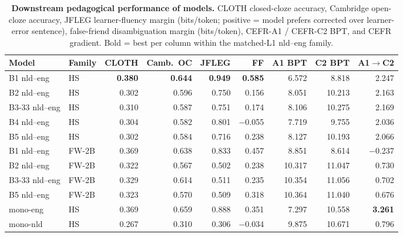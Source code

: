 \begin{table}[!ht]
  \centering \scriptsize
  \setlength{\tabcolsep}{4pt}
  \caption{\textbf{Downstream pedagogical performance of \beetle{} models.} CLOTH closed-cloze accuracy, Cambridge open-cloze accuracy, JFLEG learner-fluency margin (bits/token; positive = model prefers corrected over learner-error sentence), false-friend disambiguation margin (bits/token), CEFR-A1 / CEFR-C2 BPT, and CEFR gradient. Bold = best per column within the matched-L1 nld--eng family.}
  \label{tab:headline_pedagogical}
  \begin{tabular}{llrrrrrrr}
    \toprule
    Model & Family & CLOTH & Camb.~OC & JFLEG & FF & A1 BPT & C2 BPT & A1$\to$C2 \\
    \midrule
    B1 nld--eng     & HS & \textbf{0.380} & \textbf{0.644} & \textbf{0.949} & \textbf{0.585} & 6.572 & 8.818 & 2.247 \\
    B2 nld--eng     & HS & 0.302 & 0.596 & 0.750 & 0.156 & 8.051 & 10.213 & 2.163 \\
    B3-33 nld--eng  & HS & 0.310 & 0.587 & 0.751 & 0.174 & 8.106 & 10.275 & 2.169 \\
    B4 nld--eng     & HS & 0.304 & 0.582 & 0.801 & $-$0.055 & 7.719 & 9.755 & 2.036 \\
    B5 nld--eng     & HS & 0.302 & 0.584 & 0.716 & 0.238 & 8.127 & 10.193 & 2.066 \\
    \midrule
    B1 nld--eng     & FW-2B & 0.369 & 0.638 & 0.833 & 0.457 & 8.851 & 8.614 & $-$0.237 \\
    B2 nld--eng     & FW-2B & 0.322 & 0.567 & 0.502 & 0.238 & 10.317 & 11.047 & 0.730 \\
    B3-33 nld--eng  & FW-2B & 0.329 & 0.614 & 0.511 & 0.235 & 10.354 & 11.056 & 0.702 \\
    B5 nld--eng     & FW-2B & 0.323 & 0.570 & 0.509 & 0.318 & 10.364 & 11.040 & 0.676 \\
    \midrule
    mono-eng        & HS & 0.369 & 0.659 & 0.888 & 0.351 & 7.297 & 10.558 & \textbf{3.261} \\
    mono-nld        & HS & 0.267 & 0.310 & 0.306 & $-$0.034 & 9.875 & 10.671 & 0.796 \\
    \bottomrule
  \end{tabular}
\end{table}
 
 
